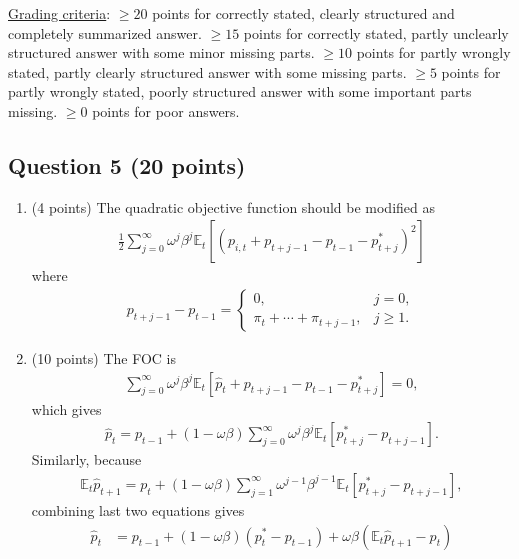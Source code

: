 \documentclass[12pt]{article}
\begin{document}
\underline{Grading criteria}: $\geq20$ points for correctly stated, clearly structured and completely summarized answer. $\geq 15$ points for correctly stated, partly unclearly structured answer with some minor missing parts. $\geq 10$ points for partly wrongly stated, partly clearly structured answer with some missing parts. $\geq 5$ points for partly wrongly stated, poorly structured answer with some important parts missing. $\geq 0$ points for poor answers.  

\newpage
\subsection*{Question 5 (20 points)}
\begin{enumerate}
    \item (4 points) The quadratic objective function should be modified as
    \begin{align*}
        \frac{1}{2} \sum_{j=0}^{\infty} \omega^j \beta^j \mathbb{E}_t \left[\left(p_{i,t} + p_{t+j-1} - p_{t-1} - p^*_{t+j}\right)^2\right]
    \end{align*}
    where
    \begin{align*}
        p_{t+j-1} - p_{t-1} = \left\{\begin{array}{ll}
            0, & j = 0, \\
            \pi_t + \cdots + \pi_{t+j-1}, & j \geq 1.
        \end{array}\right.
    \end{align*}
    \item (10 points) The FOC is
    \begin{align*}
        \sum_{j=0}^{\infty} \omega^j \beta^j \mathbb{E}_t \left[\hat{p}_t + p_{t+j-1} - p_{t-1} - p^*_{t+j}\right] = 0,
    \end{align*}
    which gives 
    \begin{align*}
        \hat{p}_t = p_{t-1} + (1-\omega\beta)\sum_{j=0}^{\infty} \omega^j \beta^j \mathbb{E}_t \left[p^*_{t+j} - p_{t+j-1}\right].
    \end{align*}
    Similarly, because 
    \begin{align*}
        \mathbb{E}_t \hat{p}_{t+1} = p_t + (1-\omega\beta) \sum_{j=1}^{\infty} \omega^{j-1} \beta^{j-1} \mathbb{E}_t[p^*_{t+j} - p_{t+j-1}],
    \end{align*}
    combining last two equations gives
    \begin{align*}
        \hat{p}_t &= p_{t-1} + (1-\omega \beta)(p^*_t - p_{t-1}) + \omega\beta\left(\mathbb{E}_t \hat{p}_{t+1} - p_t\right)\\

\end{align*}
\end{enumerate}
\end{document}
